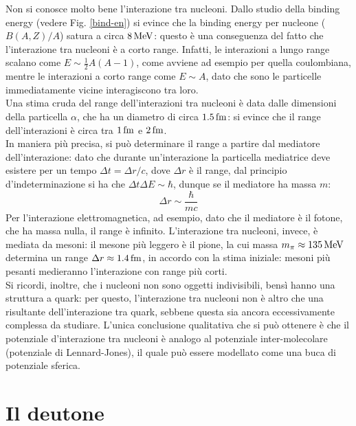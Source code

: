 Non si conosce molto bene l'interazione tra nucleoni. Dallo studio della binding energy (vedere Fig. \ref{bind-en}) si evince che la binding energy per nucleone ($ B(A,Z)/A $) satura a circa $ 8\,\mathrm{MeV} $: questo è una conseguenza del fatto che l'interazione tra nucleoni è a corto range. Infatti, le interazioni a lungo range scalano come $ E \sim \frac{1}{2} A (A - 1) $, come avviene ad esempio per quella coulombiana, mentre le interazioni a corto range come $ E \sim A $, dato che sono le particelle immediatamente vicine interagiscono tra loro.\\
Una stima cruda del range dell'interazioni tra nucleoni è data dalle dimensioni della particella $ \alpha $, che ha un diametro di circa $ 1.5\,\mathrm{fm} $: si evince che il range dell'interazioni è circa tra $ 1\,\mathrm{fm} $ e $ 2\,\mathrm{fm} $.\\
In maniera più precisa, si può determinare il range a partire dal mediatore dell'interazione: dato che durante un'interazione la particella mediatrice deve esistere per un tempo $ \Delta t = \Delta r / c $, dove $ \Delta r $ è il range, dal principio d'indeterminazione si ha che $ \Delta t \Delta E \sim \hbar $, dunque se il mediatore ha massa $ m $:
\begin{equation}
	\Delta r \sim \frac{\hbar}{m c}
	\label{eq:4.5}
\end{equation}
Per l'interazione elettromagnetica, ad esempio, dato che il mediatore è il fotone, che ha massa nulla, il range è infinito. L'interazione tra nucleoni, invece, è mediata da mesoni: il mesone più leggero è il pione, la cui massa $ m_{\pi} \approx 135\,\mathrm{MeV} $ determina un range $ \Delta r \approx 1.4 \,\mathrm{fm} $, in accordo con la stima iniziale: mesoni più pesanti medieranno l'interazione con range più corti.\\
Si ricordi, inoltre, che i nucleoni non sono oggetti indivisibili, bensì hanno una struttura a quark: per questo, l'interazione tra nucleoni non è altro che una risultante dell'interazione tra quark, sebbene questa sia ancora eccessivamente complessa da studiare. L'unica conclusione qualitativa che si può ottenere è che il potenziale d'interazione tra nucleoni è analogo al potenziale inter-molecolare (potenziale di Lennard-Jones), il quale può essere modellato come una buca di potenziale sferica.

\section{Il deutone}

